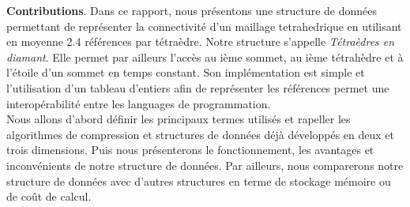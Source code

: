 \documentclass[a4paper,11pt,openany]{article}
\begin{document}
\textbf{Contributions}. Dans ce rapport, nous présentons une structure de données permettant de représenter la connectivité d'un maillage tetrahedrique en utilisant en moyenne 2.4 références par tétraèdre. Notre structure s'appelle \textit{Tétraèdres en diamant}. Elle permet par ailleurs l'accès au ième sommet, au ième tétrahèdre et à l'étoile d'un sommet en temps constant. Son implémentation est simple et l'utilisation d'un tableau d'entiers afin de représenter les références permet une interopérabilité entre les languages de programmation.\\
Nous allons d'abord définir les principaux termes utilisés et rapeller les algorithmes de compression et structures de données déjà développés en deux et trois dimensions. Puis nous présenterons le fonctionnement, les avantages et inconvénients de notre structure de données. Par ailleurs, nous comparerons notre structure de données avec d'autres structures en terme de stockage mémoire ou de coût de calcul.
\end{document}
